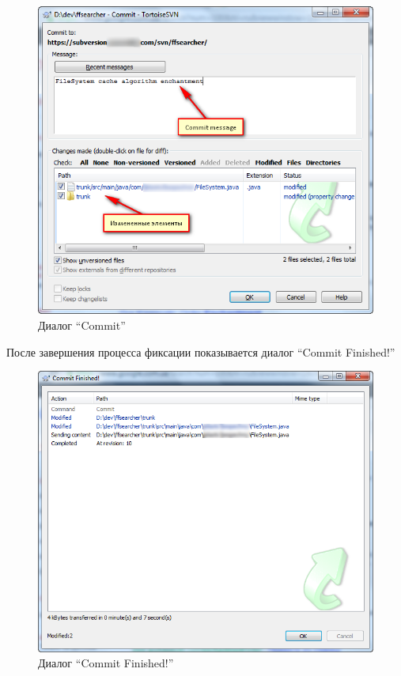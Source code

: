 \documentclass[a4paper,12pt]{article}
\begin{document}
\begin{figure}[h!]
	\centering
	\includegraphics[scale=0.70]{tortoisesvn-work-instractions-step-5.png}
	\vspace{-10pt}
	\caption{Диалог ``Commit''}
\end{figure}

После завершения процесса фиксации показывается диалог ``Commit
Finished!''

\begin{figure}[h!]
	\centering
	\includegraphics[scale=0.55]{tortoisesvn-work-instractions-step-6.png}
	\vspace{-10pt}
	\caption{Диалог ``Commit Finished!''}
\end{figure}
\end{document}
